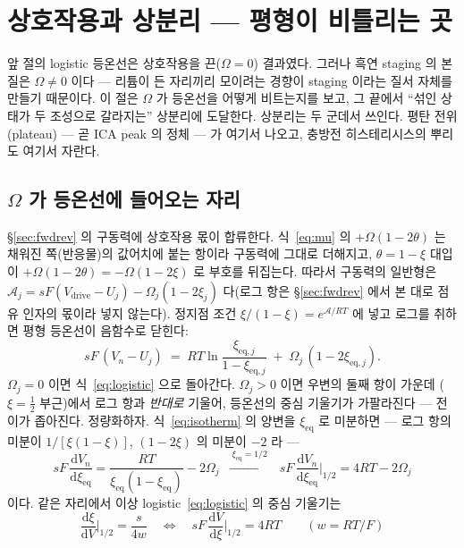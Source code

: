 \documentclass[11pt,a4paper]{article}
\newcommand{\dd}{\mathrm{d}}
\newcommand{\eq}{\mathrm{eq}}
\newcommand{\drive}{\mathrm{drive}}
\begin{document}
\section{상호작용과 상분리 — 평형이 비틀리는 곳}\label{sec:regsol}
앞 절의 logistic 등온선은 상호작용을 끈($\Omega=0$) 결과였다. 그러나 흑연 staging 의 본질은
$\Omega\ne0$ 이다 — 리튬이 든 자리끼리 모이려는 경향이 staging 이라는 질서 자체를 만들기 때문이다. 이
절은 $\Omega$ 가 등온선을 어떻게 비트는지를 보고, 그 끝에서 ``섞인 상태가 두 조성으로 갈라지는'' 상분리에
도달한다. 상분리는 두 군데서 쓰인다. 평탄 전위(plateau) — 곧 ICA peak 의 정체 — 가 여기서 나오고, 충방전
히스테리시스의 뿌리도 여기서 자란다.

\subsection{$\Omega$ 가 등온선에 들어오는 자리}
\S\ref{sec:fwdrev} 의 구동력에 상호작용 몫이 합류한다. 식~\eqref{eq:mu} 의 $+\Omega(1-2\theta)$ 는
채워진 쪽(반응물)의 값어치에 붙는 항이라 구동력에 그대로 더해지고, $\theta=1-\xi$ 대입이
$+\Omega(1-2\theta)=-\Omega(1-2\xi)$ 로 부호를 뒤집는다. 따라서 구동력의 일반형은
$\mathcal A_j=sF(V_\drive-U_j)-\Omega_j(1-2\xi_j)$ 다(로그 항은 \S\ref{sec:fwdrev} 에서 본 대로
점유 인자의 몫이라 넣지 않는다). 정지점 조건 $\xi/(1-\xi)=e^{\mathcal A/RT}$ 에 넣고 로그를 취하면 평형
등온선이 음함수로 닫힌다:
\begin{equation}
sF\,(V_n-U_j)\;=\;RT\ln\frac{\xi_{\eq,j}}{1-\xi_{\eq,j}}\;+\;\Omega_j\,(1-2\xi_{\eq,j}).
\label{eq:isotherm}
\end{equation}
$\Omega_j=0$ 이면 식~\eqref{eq:logistic} 으로 돌아간다. $\Omega_j>0$ 이면 우변의 둘째 항이 가운데
($\xi=\tfrac12$ 부근)에서 로그 항과 \emph{반대로} 기울어, 등온선의 중심 기울기가 가팔라진다 — 전이가
좁아진다. 정량화하자. 식~\eqref{eq:isotherm} 의 양변을 $\xi_{\eq}$ 로 미분하면 — 로그 항의 미분이
$1/[\xi(1-\xi)]$, $(1-2\xi)$ 의 미분이 $-2$ 라 —
\begin{equation}
sF\,\frac{\dd V_n}{\dd\xi_{\eq}}
=\frac{RT}{\xi_{\eq}(1-\xi_{\eq})}-2\Omega_j
\;\;\xrightarrow{\ \xi_{\eq}=1/2\ }\;\;
sF\,\frac{\dd V_n}{\dd\xi_{\eq}}\Big|_{1/2}=4RT-2\Omega_j
\label{eq:isoslope}
\end{equation}
이다. 같은 자리에서 이상 logistic~\eqref{eq:logistic} 의 중심 기울기는
\begin{equation}
\frac{\dd\xi}{\dd V}\Big|_{1/2}=\frac{s}{4w}
\quad\Longleftrightarrow\quad
sF\,\frac{\dd V}{\dd\xi}\Big|_{1/2}=4RT
\qquad(w=RT/F)
\label{eq:logslope}
\end{equation}
\end{document}
